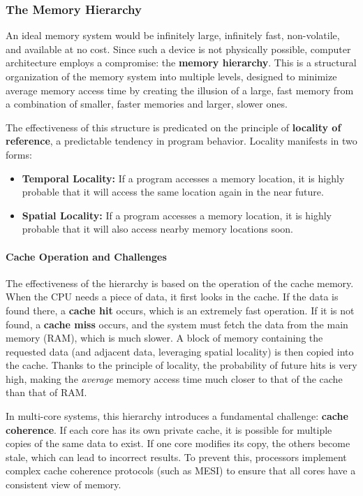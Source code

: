 \subsubsection*{The Memory Hierarchy}
\label{subsec:memory_hierarchy}

An ideal memory system would be infinitely large, infinitely fast, non-volatile, and available at no cost. Since such a device is not physically possible, computer architecture employs a compromise: the \textbf{memory hierarchy}. This is a structural organization of the memory system into multiple levels, designed to minimize average memory access time by creating the illusion of a large, fast memory from a combination of smaller, faster memories and larger, slower ones.

The effectiveness of this structure is predicated on the principle of \textbf{locality of reference}, a predictable tendency in program behavior. Locality manifests in two forms:
\begin{itemize}
    \item \textbf{Temporal Locality:} If a program accesses a memory location, it is highly probable that it will access the same location again in the near future.
    \item \textbf{Spatial Locality:} If a program accesses a memory location, it is highly probable that it will also access nearby memory locations soon.
\end{itemize}

\paragraph{Cache Operation and Challenges}
The effectiveness of the hierarchy is based on the operation of the cache memory. When the CPU needs a piece of data, it first looks in the cache. If the data is found there, a \textbf{cache hit} occurs, which is an extremely fast operation. If it is not found, a \textbf{cache miss} occurs, and the system must fetch the data from the main memory (RAM), which is much slower. A block of memory containing the requested data (and adjacent data, leveraging spatial locality) is then copied into the cache. Thanks to the principle of locality, the probability of future hits is very high, making the \textit{average} memory access time much closer to that of the cache than that of RAM.

In multi-core systems, this hierarchy introduces a fundamental challenge: \textbf{cache coherence}. If each core has its own private cache, it is possible for multiple copies of the same data to exist. If one core modifies its copy, the others become stale, which can lead to incorrect results. To prevent this, processors implement complex cache coherence protocols (such as MESI) to ensure that all cores have a consistent view of memory.

